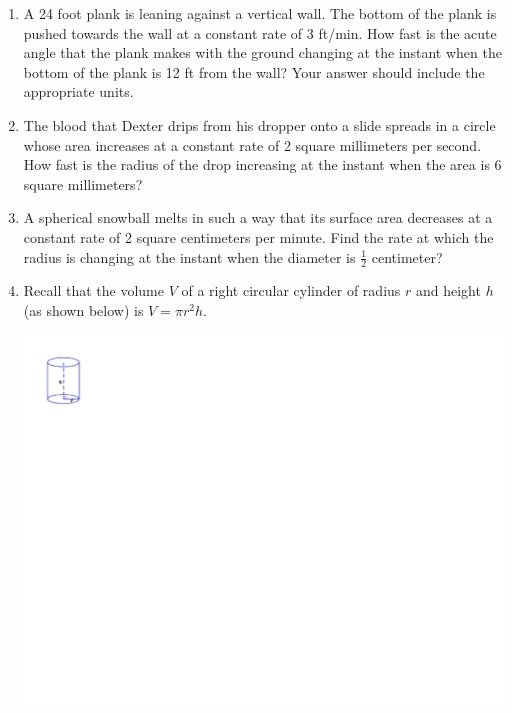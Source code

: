 \documentclass[12pt]{article}
\newif\ifans
\begin{document}
\begin{enumerate}
\ifans{\fbox{25 miles per hour}} \fi

\item A 24 foot plank is leaning against a vertical wall.  The bottom of the plank is pushed towards the wall at a constant rate of 3 ft/min.  How fast is the acute angle that the plank makes with the ground changing at the instant when the bottom of the plank is 12 ft from the wall?  Your answer should include the appropriate units.

\ifans{\fbox{$\frac{1}{4\sqrt{3}}$ radians per minute}} \fi

\item The blood that Dexter drips from his dropper onto a slide spreads in a circle whose area increases at a constant rate of 2 square millimeters per second.  How fast is the radius of the drop increasing at the instant when the area is 6 square millimeters? 

\ifans{\fbox{$\frac{1}{\sqrt{6\pi}}$ millimeters per second}} \fi

\item A spherical snowball melts in such a way that its surface area decreases at a constant rate of 2 square centimeters per minute.  Find the rate at which the radius is changing at the instant when the diameter is $\frac{1}{2}$ centimeter?

\ifans{\fbox{$-\frac{1}{\pi}$ cm per min}} \fi

\item Recall that the volume $V$ of a right circular cylinder of radius $r$ and height $h$ (as shown below) is $V=\pi r^2h$.
\begin{center}
\includegraphics[scale=0.9]{cylinder.pdf}
\end{center}


\end{enumerate}
\end{document}
